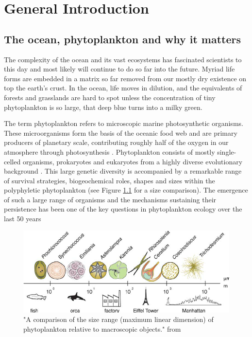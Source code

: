 \chapter{General Introduction}

\section{The ocean, phytoplankton and why it matters}

The complexity of the ocean and its vast ecosystems has fascinated scientists to this day and most likely will continue to do so far into the future. Myriad life forms are embedded in a matrix so far removed from our mostly dry existence on top the earth’s crust. In the ocean, life moves in dilution, and the equivalents of forests and grasslands are hard to spot unless the concentration of tiny phytoplankton is so large, that deep blue turns into a milky green.

The term phytoplankton refers to microscopic marine photosynthetic organisms. These microorganisms form the basis of the oceanic food web and are primary producers of planetary scale, contributing roughly half of the oxygen in our atmosphere through photosynthesis \citep{Field2009}. Phytoplankton consists of mostly single-celled organisms, prokaryotes and eukaryotes from a highly diverse evolutionary background \citep{Falkowski2004a}. This large genetic diversity is accompanied by a remarkable range of survival strategies, biogeochemical roles, shapes and sizes within the polyphyletic phytoplankton (see Figure \ref{FinkelPhySizeRange} for a size comparison). The emergence of such a large range of organisms and the mechanisms sustaining their persistence has been one of the key questions in phytoplankton ecology over the last 50 years \citep{Hutchinson1961}

\begin{figure}
\centering
\includegraphics[trim = 0mm 0mm 0mm 0mm, clip, width=.9\linewidth]{./Chp1-Intro/SIZEphytoComparison_FinkelEtAl2010.png}
\caption[Scheme]{{\small "A comparison of the size range (maximum linear dimension) of phytoplankton
relative to macroscopic objects." from \cite{Finkel2010}}}
\label{FinkelPhySizeRange}
\end{figure}


